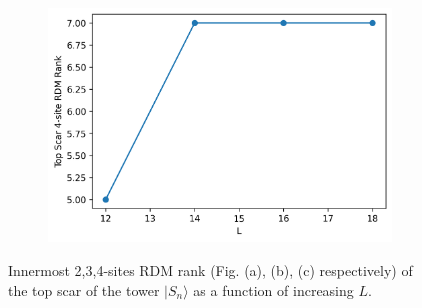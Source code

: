 \documentclass[11pt]{article}
\begin{document}
\begin{itemize}
\begin{itemize}
\begin{figure}[H]
\begin{subfigure}{0.45\textwidth}
        \includegraphics[width=\linewidth]{dw_scar_4.png}
        \caption{}
        \label{fig:image3}
    \end{subfigure}

    \caption{Innermost 2,3,4-sites RDM  rank (Fig. (a), (b), (c) respectively) of the top scar of the tower $|S_n\rangle$ as a function of increasing $L$.}
    \label{fig:dw_scars_tower}
\end{figure}


\end{itemize}
\end{itemize}
\end{document}
